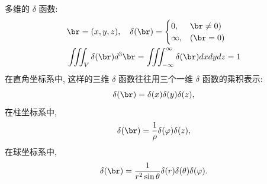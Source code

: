 多维的 $\delta$ 函数:
$$
\begin{aligned}
& \br=(x,y,z), \quad \delta (\br)= \begin{cases}0,  & \br \neq 0) \\
\infty, & (\br=0)\end{cases} \\
& \iiint_V \delta(\br)d^3 \br=\iiint_{-\infty}^{\infty} \delta(\br) dx dy dz=1
\end{aligned}
$$
在直角坐标系中, 这样的三维 $\delta$ 函数往往用三个一维 $\delta$ 函数的乘积表示:
\begin{equation}
    \delta(\br)=\delta(x) \delta(y) \delta(z),
\end{equation}
在柱坐标系中,
\begin{equation}
    \delta(\br)=\frac{1}{\rho} \delta(\varphi)\delta(z),
\end{equation}
在球坐标系中,
\begin{equation}
    \delta(\br)=\frac{1}{r^2\sin{\theta}} \delta(r) \delta(\theta) \delta(\varphi).
\end{equation}